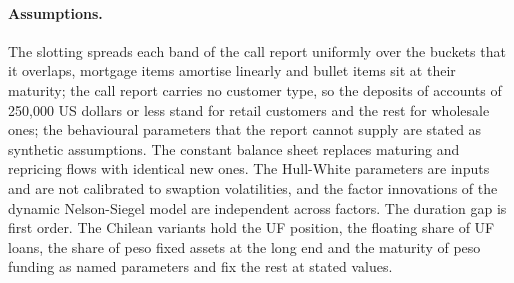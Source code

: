 \paragraph{Assumptions.}
The slotting spreads each band of the call report uniformly over the buckets that it overlaps, mortgage items amortise linearly and bullet items sit at their maturity; the call report carries no customer type, so the deposits of accounts of 250,000 US dollars or less stand for retail customers and the rest for wholesale ones; the behavioural parameters that the report cannot supply are stated as synthetic assumptions. The constant balance sheet replaces maturing and repricing flows with identical new ones. The Hull-White parameters are inputs and are not calibrated to swaption volatilities, and the factor innovations of the dynamic Nelson-Siegel model are independent across factors. The duration gap is first order. The Chilean variants hold the UF position, the floating share of UF loans, the share of peso fixed assets at the long end and the maturity of peso funding as named parameters and fix the rest at stated values.

